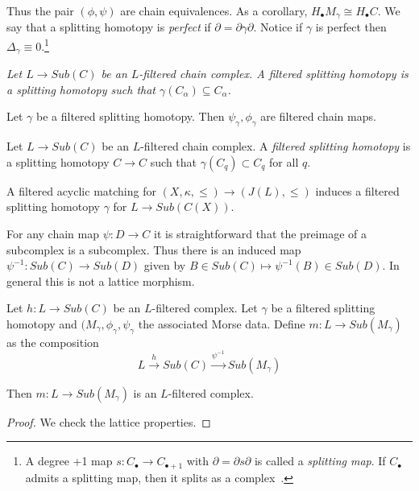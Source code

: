 Thus the pair $(\phi,\psi)$ are chain equivalences.  As a corollary, $H_\bullet M_\gamma\cong H_\bullet C$.  We say that a splitting homotopy is {\em perfect} if $\partial = \partial\gamma\partial$.  Notice if $\gamma$ is perfect then $\Delta_\gamma\equiv 0$.\footnote{A degree +1 map $s:C_\bullet \to C_{\bullet+1}$ with $\partial=\partial s\partial$ is called a {\em splitting map}. If $C_\bullet$ admits a splitting map, then it splits as a complex~\cite[Ex. 1.4.2]{weibel}.}


\begin{defn}
{\em
Let $L\to Sub(C)$ be an $L$-filtered chain complex.  A {\em filtered splitting homotopy} is a splitting homotopy such that $\gamma(C_\alpha)\subseteq C_\alpha$.
}
\end{defn}


\begin{prop}
Let $\gamma$ be a filtered splitting homotopy.  Then $\psi_\gamma,\phi_\gamma$ are filtered chain maps.
\end{prop}




\begin{defn}
Let $L\to Sub(C)$ be an $L$-filtered chain complex.  A {\em filtered splitting homotopy} is a splitting homotopy $C\to C$ such that $\gamma(C_q)\subset C_q$ for all $q$.
\end{defn}

\begin{prop}
A filtered acyclic matching for $(X,\kappa,\leq)\to (J(L),\leq)$ induces a filtered splitting homotopy $\gamma$ for $L\to Sub(C(X))$.  
\end{prop}


For any chain map $\psi:D\to C$ it is straightforward that the preimage of a subcomplex is a subcomplex.  Thus there is an induced map $\psi^{-1}:Sub(C)\to Sub(D)$ given by $B\in Sub(C)\mapsto \psi^{-1}(B)\in Sub(D)$.  In general this is not a lattice morphism.


\begin{prop}
Let $h:L\to Sub(C)$ be an $L$-filtered complex.  Let $\gamma$ be a filtered splitting homotopy and $(M_\gamma,\phi_\gamma,\psi_\gamma$ the associated Morse data. Define $m:L\to Sub(M_\gamma)$ as the composition $$L\xrightarrow{h} Sub(C) \xrightarrow{\psi^{-1}} Sub(M_\gamma)$$

Then  $m:L\to Sub(M_\gamma)$ is an $L$-filtered complex.
\end{prop}
\begin{proof}
We check the lattice properties.  

\end{proof}



